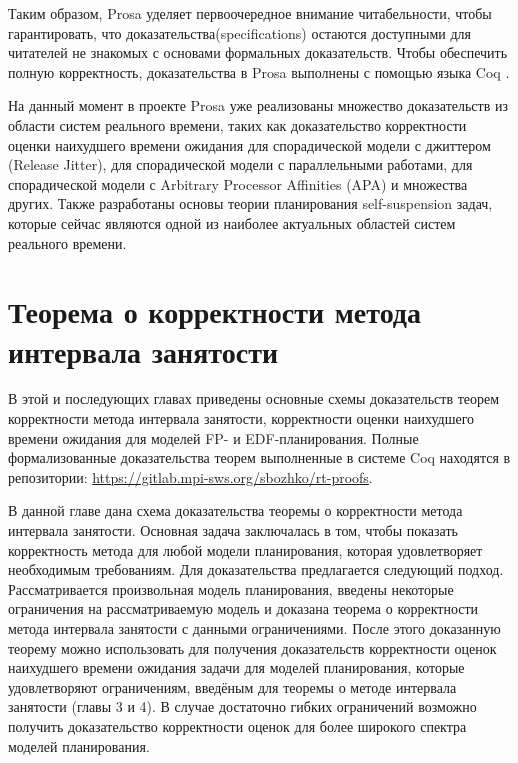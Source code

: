 \documentclass[14pt]{matmex-diploma-custom}
\begin{document}
Таким образом, Prosa уделяет первоочередное внимание читабельности, 
  чтобы гарантировать, что доказательства(specifications) остаются доступными для 
  читателей не знакомых с основами формальных доказательств. Чтобы обеспечить полную
  корректность, доказательства в Prosa выполнены с помощью языка Coq \cite{Coq}.

На данный момент в проекте Prosa уже реализованы множество доказательств из области систем реального времени, таких как 
  доказательство корректности оценки наихудшего времени ожидания для спорадической модели 
  с джиттером (Release Jitter), для спорадической модели с параллельными работами, 
  для спорадической модели с Arbitrary Processor Affinities (APA) и множества других. 
  Также разработаны основы теории планирования self-suspension задач, которые сейчас являются 
  одной из наиболее актуальных областей систем реального времени. 


\section{Теорема о корректности метода интервала занятости}

В этой и последующих главах приведены основные схемы доказательств теорем корректности метода интервала занятости, корректности оценки наихудшего времени ожидания для моделей FP- и EDF-планирования. 
  Полные формализованные доказательства теорем выполненные в системе Coq находятся в репозитории: \url{https://gitlab.mpi-sws.org/sbozhko/rt-proofs}.

В данной главе дана схема доказательства  теоремы о корректности метода интервала 
  занятости. Основная задача заключалась в том, чтобы показать корректность метода 
  для любой модели планирования,  которая удовлетворяет необходимым требованиям. 
  Для доказательства предлагается следующий подход. Рассматривается произвольная модель планирования, 
  введены некоторые ограничения на рассматриваемую модель и доказана теорема о корректности
  метода интервала занятости с данными ограничениями. После этого доказанную теорему 
  можно использовать для получения доказательств корректности оценок наихудшего 
  времени ожидания задачи для моделей планирования, которые удовлетворяют ограничениям, 
  введёным для теоремы о методе интервала занятости (главы 3 и 4). В случае достаточно гибких 
  ограничений возможно получить доказательство корректности оценок для более широкого 
  спектра моделей планирования. 
  
\end{document}
